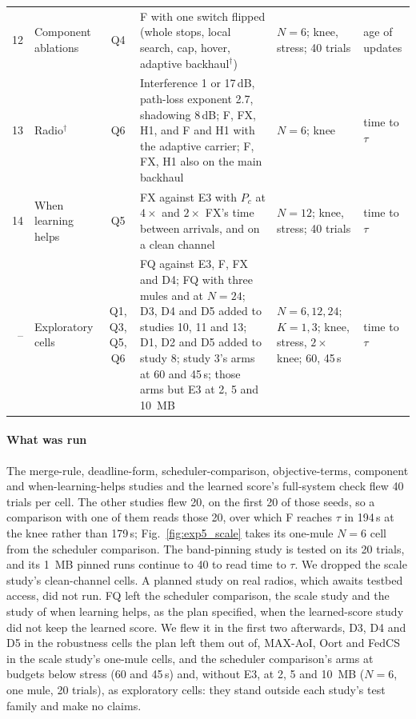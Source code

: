\begin{table}[tp]
\begin{tabularx}{\textwidth}{@{}r l c L l l@{}}
12 & Component ablations & Q4 & F with one switch flipped (whole stops, local search, cap, hover, adaptive backhaul$^{\dagger}$) & $N{=}6$; knee, stress; 40 trials & age of updates \\
13 & Radio$^{\dagger}$ & Q6 & Interference 1 or 17\,dB, path-loss exponent 2.7, shadowing 8\,dB; F, FX, H1, and F and H1 with the adaptive carrier; F, FX, H1 also on the main backhaul & $N{=}6$; knee & time to $\tau$ \\
14 & When learning helps & Q5 & FX against E3 with $P_c$ at $4\times$ and $2\times$ FX's time between arrivals, and on a clean channel & $N{=}12$; knee, stress; 40 trials & time to $\tau$ \\
\midrule
-- & Exploratory cells & Q1, Q3, Q5, Q6 & FQ against E3, F, FX and D4; FQ with three mules and at $N{=}24$; D3, D4 and D5 added to studies 10, 11 and 13; D1, D2 and D5 added to study 8; study 3's arms at 60 and 45\,s; those arms but E3 at 2, 5 and 10~MB & $N{=}6,12,24$; $K{=}1,3$; knee, stress, $2\times$ knee; 60, 45\,s & time to $\tau$ \\
\bottomrule
\end{tabularx}
\end{table}

\paragraph{What was run}
The merge-rule, deadline-form, scheduler-comparison, objective-terms, component
and when-learning-helps studies and the learned score's full-system check flew
40 trials per cell. The other studies flew 20, on the first 20 of those seeds, so a comparison
with one of them reads those 20, over which F reaches $\tau$ in 194\,s at the
knee rather than 179\,s; Fig.~\ref{fig:exp5_scale} takes its one-mule $N=6$
cell from the scheduler comparison. The band-pinning study is
tested on its 20 trials, and its 1~MB pinned runs continue to 40 to read time to
$\tau$. We dropped the scale study's clean-channel cells. A planned study on real radios, which
awaits testbed access, did not run. FQ left the scheduler comparison, the scale
study and the study of when learning helps, as the plan specified, when the
learned-score study did not keep the learned score. We flew it in the first two
afterwards, D3, D4 and D5 in the robustness cells the plan left them out of, MAX-AoI,
Oort and FedCS in the scale study's one-mule cells, and the
scheduler comparison's arms at budgets below stress
(60 and 45\,s) and, without E3, at 2, 5 and 10~MB ($N=6$, one mule, 20 trials), as exploratory cells: they stand
outside each study's test family and make no claims.
